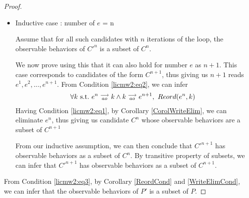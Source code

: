 \begin{proof}
\begin{itemize}
        \item Inductive case : number of $e$ = n

        Assume that for all such candidates with $n$ iterations of the loop, the observable behaviors of $C'^n$ is a subset of $C^n$.

        We now prove using this that it can also hold for number $e$ as $n + 1$. 
        This case corresponds to candidates of the form $C^{n+1}$, thus giving us $n+1$ reads $e^1, e^2,...,e^{n+1}$.
        From Condition \ref{licmw2:eq2}, we can infer 
        \begin{align*}
            \forall k \ \text{s.t.} \ e^n\stackrel{\longrightarrow}{_{ao}}k \wedge k\stackrel{\longrightarrow}{_{ao}}e^{n+1}, \ Reord(e^{n}, k)
        \end{align*}
        Having Condition \ref{licmw2:eq1}, by Corollary \ref{CorolWriteElim}, we can eliminate $e^{n}$, thus giving us candidate $C^{n}$ whose observable behaviors are a subset of $C^{n+1}$

        From our inductive assumption, we can then conclude that $C'^{n+1}$ has observable behaviors as a subset of $C^n$. 
        By transitive property of subsets, we can infer that $C'^{n+1}$ has observable behaviors as a subset of $C^{n+1}$.



    \end{itemize}
    
    From Condition \ref{licmw2:eq3}, by Corollary \ref{ReordCond} and \ref{WriteElimCond}, we can infer that the observable behaviors of $P'$ is a subset of $P$.

\end{proof}
